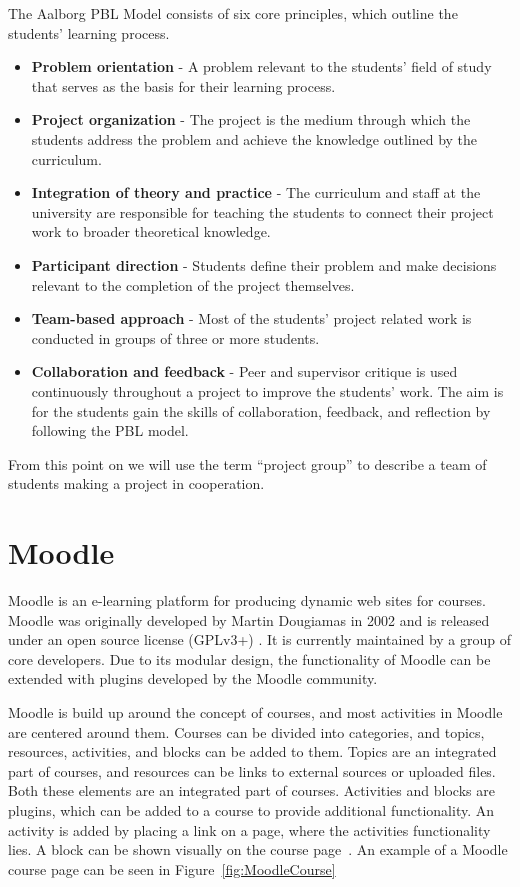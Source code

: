 The Aalborg PBL Model consists of six core principles, which outline the students' learning process.
\begin{itemize}
	\item \textbf{Problem orientation} - A problem relevant to the students' field of study that serves as the basis for their learning process.
	\item \textbf{Project organization} - The project is the medium through which the students address the problem and achieve the knowledge outlined by the curriculum.
	\item \textbf{Integration of theory and practice} - The curriculum and staff at the university are responsible for teaching the students to connect their project work to broader theoretical knowledge.
	\item \textbf{Participant direction} - Students define their problem and make decisions relevant to the completion of the project themselves.
	\item \textbf{Team-based approach} - Most of the students' project related work is conducted in groups of three or more students.
	\item \textbf{Collaboration and feedback} - Peer and supervisor critique is used continuously throughout a project to improve the students' work.
	The aim is for the students gain the skills of collaboration, feedback, and reflection by following the PBL model. 
\end{itemize}

From this point on we will use the term ``project group'' to describe a team of students making a project in cooperation.


\section{Moodle}
Moodle is an e-learning platform for producing dynamic web sites for courses. 
Moodle was originally developed by Martin Dougiamas in 2002 and is released under an open source license (GPLv3+) \citep{gpl}. 
It is currently maintained by a group of core developers. 
Due to its modular design, the functionality of Moodle can be extended with plugins developed by the Moodle community.

Moodle is build up around the concept of courses, and most activities in Moodle are centered around them. 
Courses can be divided into categories, and topics, resources, activities, and blocks can be added to them. 
Topics are an integrated part of courses, and resources can be links to external sources or uploaded files. 
Both these elements are an integrated part of courses. 
Activities and blocks are plugins, which can be added to a course to provide additional functionality. 
An activity is added by placing a link on a page, where the activities functionality lies. 
A block can be shown visually on the course page~\citep{moodleStructural}.
An example of a Moodle course page can be seen in Figure~\ref{fig:MoodleCourse}

